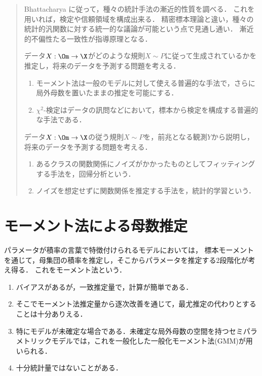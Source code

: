 \documentclass[uplatex,dvipdfmx]{jsreport}
\begin{document}
\begin{quotation}
    Bhattacharya \cite{Bhattacharya-LargeSampleTheory}に従って，種々の統計手法の漸近的性質を調べる．
    これを用いれば，検定や信頼領域を構成出来る．
    精密標本理論と違い，種々の統計的汎関数に対する統一的な議論が可能という点で見通し通い．
    漸近的不偏性たる一致性が指導原理となる．

    データ$X:\Om\to\X$がどのような規則$X\sim P$に従って生成されているかを推定し，将来のデータを予測する問題を考える．
    \begin{enumerate}
        \item モーメント法は一般のモデルに対して使える普遍的な手法で，さらに局外母数を置いたままの推定を可能にする．
        \item $\chi^2$-検定はデータの訊問などにおいて，標本から検定を構成する普遍的な手法である．
    \end{enumerate}
    データ$X:\Om\to\X$の従う規則$X\sim P$を，前兆となる観測$Y$から説明し，将来のデータを予測する問題を考える．
    \begin{enumerate}
        \item あるクラスの関数関係にノイズがかかったものとしてフィッティングする手法を，回帰分析という．
        \item ノイズを想定せずに関数関係を推定する手法を，統計的学習という．
    \end{enumerate}
\end{quotation}

\section{モーメント法による母数推定}

\begin{tcolorbox}[colframe=ForestGreen, colback=ForestGreen!10!white,breakable,colbacktitle=ForestGreen!40!white,coltitle=black,fonttitle=\bfseries\sffamily,
title=モーメント法]
    パラメータが積率の言葉で特徴付けられるモデルにおいては，
    標本モーメントを通じて，母集団の積率を推定し，そこからパラメータを推定する2段階化が考え得る．
    これをモーメント法という．
    \begin{enumerate}
        \item バイアスがあるが，一致推定量で，計算が簡単である．
        \item そこでモーメント法推定量から逐次改善を通じて，最尤推定の代わりとすることは十分ありえる．
        \item 特にモデルが未確定な場合である．未確定な局外母数の空間を持つセミパラメトリックモデルでは，これを一般化した一般化モーメント法(GMM)が用いられる．
        \item 十分統計量ではないことがある．
    \end{enumerate}
\end{tcolorbox}
\end{document}
